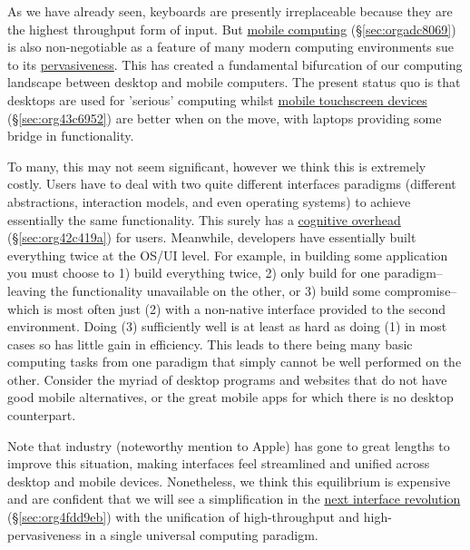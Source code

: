 \documentclass[logo,bsc,singlespacing,parskip]{infthesis}
\begin{document}
As we have already seen, keyboards are presently irreplaceable because they are the highest throughput form of input.
But \hyperref[sec:orgadc8069]{mobile computing} (\S \ref{sec:orgadc8069}) is also non-negotiable as a feature of many modern computing environments sue to its \hyperref[pervasiveness]{pervasiveness}.
This has created a fundamental bifurcation of our computing landscape between desktop and mobile computers.
The present status quo is that desktops are used for 'serious' computing whilst \hyperref[sec:org43c6952]{mobile touchscreen devices} (\S \ref{sec:org43c6952}) are better when on the move, with laptops providing some bridge in functionality.

To many, this may not seem significant, however we think this is extremely costly.
Users have to deal with two quite different interfaces paradigms (different abstractions, interaction models, and even operating systems) to achieve essentially the same functionality.
This surely has a \hyperref[sec:org42c419a]{cognitive overhead} (\S \ref{sec:org42c419a}) for users.
Meanwhile, developers have essentially built everything twice at the OS/UI level.
For example, in building some application you must choose to 1) build everything twice, 2) only build for one paradigm-- leaving the functionality unavailable on the other, or 3) build some compromise-- which is most often just (2) with a non-native interface provided to the second environment.
Doing (3) sufficiently well is at least as hard as doing (1) in most cases so has little gain in efficiency.
This leads to there being many basic computing tasks from one paradigm that simply cannot be well performed on the other.
Consider the myriad of desktop programs and websites that do not have good mobile alternatives, or the great mobile apps for which there is no desktop counterpart.

Note that industry (noteworthy mention to Apple) has gone to great lengths to improve this situation, making interfaces feel streamlined and unified across desktop and mobile devices.
Nonetheless, we think this equilibrium is expensive and are confident that we will see a simplification in the \hyperref[sec:org4fdd9eb]{next interface revolution} (\S \ref{sec:org4fdd9eb}) with the unification of high-throughput and high-pervasiveness in a single universal computing paradigm.
\end{document}

